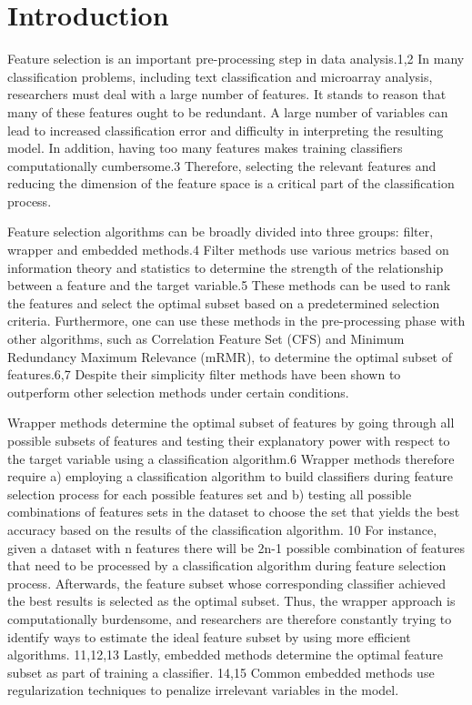 \documentclass[review]{elsarticle}
\begin{document}
\linenumbers


\section{Introduction}


Feature selection is an important pre-processing step in data analysis.1,2 In many classification problems, including text classification and microarray analysis, researchers must deal with a large number of features. It stands to reason that many of these features ought to be redundant. A large number of variables can lead to increased classification error and difficulty in interpreting the resulting model. In addition, having too many features makes training classifiers computationally cumbersome.3 Therefore, selecting the relevant features and reducing the dimension of the feature space is a critical part of the classification process. 

Feature selection algorithms can be broadly divided into three groups: filter, wrapper and embedded methods.4 Filter methods use various metrics based on information theory and statistics to determine the strength of the relationship between a feature and the target variable.5 These methods can be used to rank the features and select the optimal subset based on a predetermined selection criteria. Furthermore, one can use these methods in the pre-processing phase with other algorithms, such as Correlation Feature Set (CFS) and Minimum Redundancy Maximum Relevance (mRMR), to determine the optimal subset of features.6,7 Despite their simplicity filter methods have been shown to outperform other selection methods under certain conditions. 


Wrapper methods determine the optimal subset of features by going through all possible subsets of features and testing their explanatory power with respect to the target variable using a classification algorithm.6  Wrapper methods therefore require a) employing a classification algorithm to build classifiers during feature selection process for each possible features set and b) testing all possible combinations of features sets in the dataset to choose the set that yields the best accuracy based on the results of the classification algorithm. 10  For instance, given a dataset with n features there will be 2n-1 possible combination of features that need to be processed by a classification algorithm during feature selection process. Afterwards, the feature subset whose corresponding classifier achieved the best results is selected as the optimal subset. Thus, the wrapper approach is computationally burdensome, and researchers are therefore constantly trying to identify ways to estimate the ideal feature subset by using more efficient algorithms. 11,12,13 Lastly, embedded methods determine the optimal feature subset as part of training a classifier. 14,15 Common embedded methods use regularization techniques to penalize irrelevant variables in the model.
\end{document}
